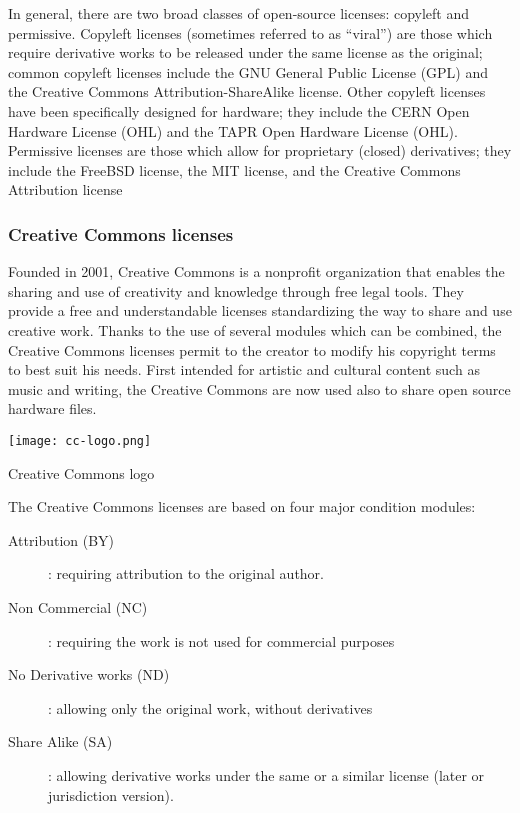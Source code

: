 In general, there are two broad classes of open-source licenses: copyleft and permissive. Copyleft licenses (sometimes referred to as “viral”) are those which require derivative works to be released under the same license as the original; common copyleft licenses include the GNU General Public License (GPL) and the Creative Commons Attribution-ShareAlike license. Other copyleft licenses have been specifically designed for hardware; they include the CERN Open Hardware License (OHL) and the TAPR Open Hardware License (OHL). Permissive licenses are those which allow for proprietary (closed) derivatives; they include the FreeBSD license, the MIT license, and the Creative Commons Attribution license


\subsubsection{Creative Commons licenses} %
\begin{row}{4}{2}
    \begin{cell}{3}
        Founded in 2001, Creative Commons is a nonprofit organization that enables the sharing and use of creativity and knowledge through free legal tools. They provide a free and understandable licenses standardizing the way to share and use creative work. Thanks to the use of several modules which can be combined, the Creative Commons licenses permit to the creator to modify his copyright terms to best suit his needs. First intended for artistic and cultural content such as music and writing, the Creative Commons are now used also to share open source hardware files.
    \end{cell}
    \begin{cell}{1}
        \begin{NFfigure}
            \centering
                \texttt{[image: cc-logo.png]}
            \caption{Creative Commons logo}
            \label{fig:cc_logo}
        \end{NFfigure}
    \end{cell}
\end{row}
The Creative Commons licenses are based on four major condition modules:
\begin{description}
    \item[Attribution (BY)]: requiring attribution to the original author.
    \item[Non Commercial (NC)]: requiring the work is not used for commercial purposes
    \item[No Derivative works (ND)]: allowing only the original work, without derivatives
    \item[Share Alike (SA)]: allowing derivative works under the same or a similar license (later or jurisdiction version).
\end{description}


